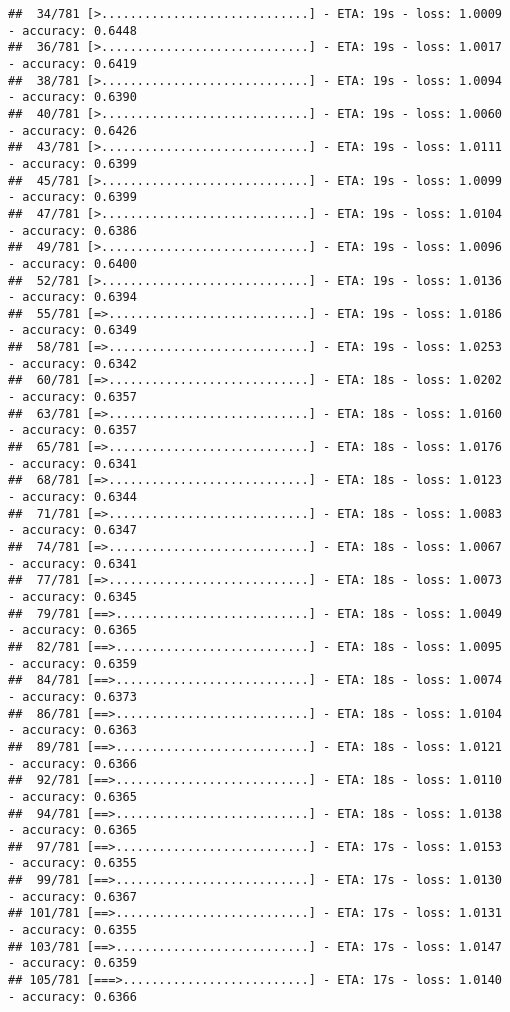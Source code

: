 \documentclass[
]{article}
\begin{document}
\begin{verbatim}
##  34/781 [>.............................] - ETA: 19s - loss: 1.0009 - accuracy: 0.6448
##  36/781 [>.............................] - ETA: 19s - loss: 1.0017 - accuracy: 0.6419
##  38/781 [>.............................] - ETA: 19s - loss: 1.0094 - accuracy: 0.6390
##  40/781 [>.............................] - ETA: 19s - loss: 1.0060 - accuracy: 0.6426
##  43/781 [>.............................] - ETA: 19s - loss: 1.0111 - accuracy: 0.6399
##  45/781 [>.............................] - ETA: 19s - loss: 1.0099 - accuracy: 0.6399
##  47/781 [>.............................] - ETA: 19s - loss: 1.0104 - accuracy: 0.6386
##  49/781 [>.............................] - ETA: 19s - loss: 1.0096 - accuracy: 0.6400
##  52/781 [>.............................] - ETA: 19s - loss: 1.0136 - accuracy: 0.6394
##  55/781 [=>............................] - ETA: 19s - loss: 1.0186 - accuracy: 0.6349
##  58/781 [=>............................] - ETA: 19s - loss: 1.0253 - accuracy: 0.6342
##  60/781 [=>............................] - ETA: 18s - loss: 1.0202 - accuracy: 0.6357
##  63/781 [=>............................] - ETA: 18s - loss: 1.0160 - accuracy: 0.6357
##  65/781 [=>............................] - ETA: 18s - loss: 1.0176 - accuracy: 0.6341
##  68/781 [=>............................] - ETA: 18s - loss: 1.0123 - accuracy: 0.6344
##  71/781 [=>............................] - ETA: 18s - loss: 1.0083 - accuracy: 0.6347
##  74/781 [=>............................] - ETA: 18s - loss: 1.0067 - accuracy: 0.6341
##  77/781 [=>............................] - ETA: 18s - loss: 1.0073 - accuracy: 0.6345
##  79/781 [==>...........................] - ETA: 18s - loss: 1.0049 - accuracy: 0.6365
##  82/781 [==>...........................] - ETA: 18s - loss: 1.0095 - accuracy: 0.6359
##  84/781 [==>...........................] - ETA: 18s - loss: 1.0074 - accuracy: 0.6373
##  86/781 [==>...........................] - ETA: 18s - loss: 1.0104 - accuracy: 0.6363
##  89/781 [==>...........................] - ETA: 18s - loss: 1.0121 - accuracy: 0.6366
##  92/781 [==>...........................] - ETA: 18s - loss: 1.0110 - accuracy: 0.6365
##  94/781 [==>...........................] - ETA: 18s - loss: 1.0138 - accuracy: 0.6365
##  97/781 [==>...........................] - ETA: 17s - loss: 1.0153 - accuracy: 0.6355
##  99/781 [==>...........................] - ETA: 17s - loss: 1.0130 - accuracy: 0.6367
## 101/781 [==>...........................] - ETA: 17s - loss: 1.0131 - accuracy: 0.6355
## 103/781 [==>...........................] - ETA: 17s - loss: 1.0147 - accuracy: 0.6359
## 105/781 [===>..........................] - ETA: 17s - loss: 1.0140 - accuracy: 0.6366

\end{verbatim}
\end{document}
